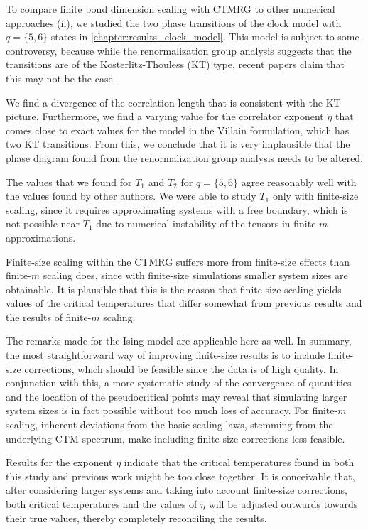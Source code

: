 To compare finite bond dimension scaling with CTMRG to other numerical approaches (ii),
we studied the two phase transitions of the clock model with $q = \{5,
6\}$ states in \autoref{chapter:results_clock_model}.
This model is subject to some controversy, because while the renormalization group analysis suggests that the
transitions are of the Kosterlitz-Thouless (KT) type, recent papers claim that this may not be the case.

We find a divergence of the correlation length that is consistent with the KT picture.
Furthermore, we find a varying value for the correlator exponent $\eta$ that comes close to exact values for the model
in the Villain formulation, which has two KT transitions.
From this, we conclude that it is very implausible that the phase diagram
found from the renormalization group analysis needs to be altered.

The values that we found for $T_1$ and $T_2$ for $q = \{ 5, 6 \}$ agree reasonably well with the values found by other
authors.
We were able to study $T_1$ only with finite-size scaling, since it requires approximating systems with a free boundary,
which is not possible near $T_1$ due to numerical instability of the tensors in finite-$m$ approximations.

Finite-size scaling within the CTMRG suffers more from finite-size effects than finite-$m$ scaling does,
since with finite-size simulations smaller system sizes are obtainable.
It is plausible that this is the reason that finite-size scaling yields values of the critical temperatures that differ
somewhat from previous results and the results of finite-$m$ scaling.

The remarks made for the Ising model are applicable here as well. In summary,
the most straightforward way of improving finite-size results is to include finite-size corrections,
which should be feasible since the data is of high quality.
In conjunction with this, a more systematic study of the convergence of quantities and the location of the
pseudocritical points may reveal that
simulating larger system sizes is in fact possible without too much loss of accuracy.
For finite-$m$ scaling, inherent deviations from the basic scaling laws, stemming from the underlying CTM spectrum, make
including finite-size corrections less feasible.

Results for the exponent $\eta$ indicate that the critical temperatures found in both this study and previous work might
be too close together.
It is conceivable that, after considering larger systems and taking into account finite-size corrections,
both critical temperatures and the values of $\eta$ will be adjusted outwards towards their true values,
thereby completely reconciling the results.

